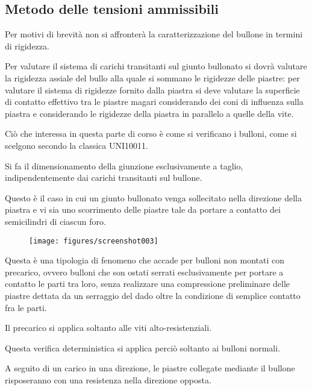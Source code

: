 \documentclass[a4paper, 15pt]{article}
\begin{document}
\subsection{Metodo delle tensioni ammissibili}
\begin{adjustwidth}{2in}{}	
	Per motivi di brevità non si affronterà la caratterizzazione del bullone in termini di rigidezza. 
	
	Per valutare il sistema di carichi transitanti sul giunto bullonato si dovrà valutare la rigidezza assiale del bullo alla quale si sommano le rigidezze delle piastre: per valutare  il sistema di rigidezze fornito dalla piastra si deve valutare la superficie di contatto effettivo tra le piastre magari considerando dei coni di influenza sulla piastra e considerando le rigidezze della piastra in parallelo a quelle della vite. \newline 
	
	Ciò che interessa in questa parte di corso è come si verificano i bulloni, come si scelgono secondo la classica UNI10011. \newline 
	
	Si fa il dimensionamento della giunzione esclusivamente a taglio, indipendentemente dai carichi transitanti sul bullone. \newline
	
	Questo è il caso in cui un giunto bullonato venga sollecitato nella direzione della piastra e vi sia uno scorrimento delle piastre  tale da portare a contatto dei semicilindri di ciascun foro. 
	 \begin{figure}[H]
	 	\centering
	 	\texttt{[image: figures/screenshot003]}
	 	\label{fig:screenshot003}
	 \end{figure}
	 Questa è una tipologia di fenomeno che accade per bulloni non montati con precarico, ovvero bulloni che son ostati  serrati esclusivamente per portare a contatto le parti tra loro, senza realizzare una compressione preliminare delle piastre dettata da un serraggio del dado oltre la condizione di semplice contatto fra le parti. 
	 
	 Il precarico si applica soltanto alle viti alto-resistenziali. \newline 
	 
	 Questa verifica deterministica si applica perciò soltanto ai bulloni normali. 
	 
	 A seguito  di un carico in una direzione, le piastre collegate mediante il bullone risposeranno con una resistenza nella direzione opposta. \newline 
	 

\end{adjustwidth}
\end{document}
